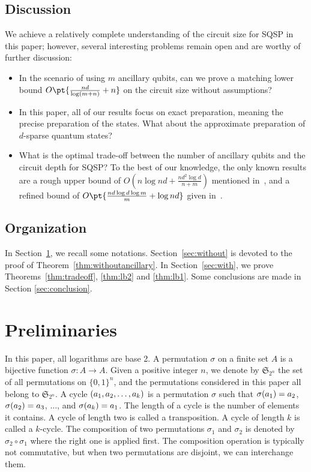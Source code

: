 \documentclass[a4paper,UKenglish,cleveref, autoref, thm-restate]{lipics-v2021}
\DeclarePairedDelimiter\rbra{\lparen}{\rparen}
\newcommand{\bo}{O\pt}
\begin{document}
\subsection{Discussion}

We achieve a relatively complete understanding of the circuit size for SQSP in this paper; however, several interesting problems remain open and are worthy of further discussion:

\begin{itemize}
\item   In the scenario of using $m$ ancillary qubits,  can we prove a matching lower bound $\bo{\frac{nd}{\log (m+n)} + n}$ on the circuit size without assumptions?

\item  In this paper, all of our results focus on exact preparation, meaning the precise preparation of the states. What about the approximate preparation of $d$-sparse quantum states?

\item What is the optimal trade-off between the number of ancillary qubits and the circuit depth for SQSP? To the best of our knowledge, the only known results are a rough upper bound of $O(n\log nd + \frac{nd^2\log d}{n + m})$ mentioned in~\cite{sun2023asymptotically}, and a refined bound of $\bo{\frac{nd\log d\log m}{m} + \log nd}$ given in~\cite{zhang2024circuit}.

\end{itemize}


\subsection{Organization}
In Section~\ref{section:pre}, we recall some notations.
Section~\ref{sec:without} is devoted to the proof of Theorem~\ref{thm:withoutancillary}.
In Section~\ref{sec:with}, we prove Theorems~\ref{thm:tradeoff}, \ref{thm:lb2} and \ref{thm:lb1}.
Some conclusions are made in Section \ref{sec:conclusion}.

\section{Preliminaries}\label{section:pre}

In this paper, all logarithms are base 2. A permutation $\sigma$ on a finite set $A$ is a bijective function $\sigma \colon A \xrightarrow{} A$. Given a positive integer $n$, we denote by $\mathfrak{S}_{2^n}$ the set of all permutations on  $\{0, 1\}^n$, and the permutations considered in this paper all belong to $\mathfrak{S}_{2^n}$. 
A cycle $\rbra{a_1, a_2, \dots, a_k}$ is a permutation $\sigma$ such that $\sigma\rbra{a_1} = a_2$, $\sigma\rbra{a_2} = a_3$, $\dots$, and $\sigma\rbra{a_k} = a_1$. The length of a cycle is the number of elements it contains. A cycle of length two is called a transposition. A cycle of length $k$ is called a $k$-cycle. The composition of two permutations $\sigma_1$ and $\sigma_2$ is denoted by $\sigma_2\circ \sigma_1$ where the right one is applied first. The composition operation is typically not commutative, but when two permutations are disjoint, we can interchange them. 
\end{document}
